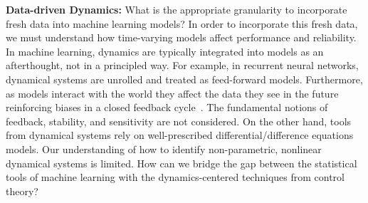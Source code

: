 {\bf Data-driven Dynamics:}  What is the appropriate granularity to incorporate fresh data into machine learning models?  In order to incorporate this fresh data, we must understand how time-varying models affect performance and reliability.  In machine learning, dynamics are typically integrated into models as an afterthought, not in a principled way.  For example, in recurrent neural networks, dynamical systems are unrolled and treated as feed-forward models.  Furthermore, as models interact with the world they affect the data they see in the future reinforcing biases in a closed feedback cycle~\cite{Li10, Bottou13}.  The fundamental notions of feedback, stability, and sensitivity are not considered.  On the other hand, tools from dynamical systems rely on well-prescribed differential/difference equations models.  Our understanding of how to identify non-parametric, nonlinear dynamical systems is limited.  How can we bridge the gap between the statistical tools of machine learning with the dynamics-centered techniques from control theory?
